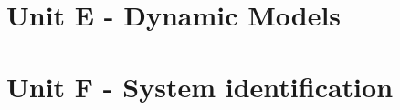 \documentclass[12pt]{article}
\begin{document}
\section*{Unit E - Dynamic Models}
\graphicspath{ {./unit_E/images/} }
\begin{ExerciseList}
    
    
    
    
    
    
    
    
\end{ExerciseList}
\newpage

\section*{Unit F - System identification}
\graphicspath{ {./unit_F/images/} }
\begin{ExerciseList}
    
    
    
\end{ExerciseList}   
\end{document}
